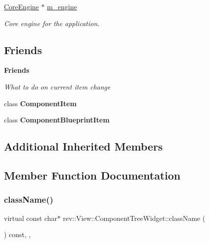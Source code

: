 \begin{Indent}
\begin{DoxyCompactItemize}
\mbox{\label{classrev_1_1_view_1_1_component_tree_widget_a73fb084a1152bd0651b83a28541cb4d8}} 
\mbox{\hyperlink{classrev_1_1_core_engine}{Core\+Engine}} $\ast$ \mbox{\hyperlink{classrev_1_1_view_1_1_component_tree_widget_a73fb084a1152bd0651b83a28541cb4d8}{m\+\_\+engine}}
\begin{DoxyCompactList}\small\item\em Core engine for the application. \end{DoxyCompactList}\end{DoxyCompactItemize}
\end{Indent}
\subsection*{Friends}
\begin{Indent}\textbf{ Friends}\par
{\em What to do on current item change }\begin{DoxyCompactItemize}
\item 
\mbox{\label{classrev_1_1_view_1_1_component_tree_widget_acec94514a84d95eff36a2411ebf9c1c8}} 
class {\bfseries Component\+Item}
\item 
\mbox{\label{classrev_1_1_view_1_1_component_tree_widget_aeb71a91b3e1105443eee3dc173353d52}} 
class {\bfseries Component\+Blueprint\+Item}
\end{DoxyCompactItemize}
\end{Indent}
\subsection*{Additional Inherited Members}


\subsection{Member Function Documentation}
\mbox{\label{classrev_1_1_view_1_1_component_tree_widget_a906360e88a18432b36c9d769a8e3886c}} 
\subsubsection{\texorpdfstring{className()}{className()}}
{\footnotesize\ttfamily virtual const char$\ast$ rev\+::\+View\+::\+Component\+Tree\+Widget\+::class\+Name (\begin{DoxyParamCaption}{ }\end{DoxyParamCaption}) const\hspace{0.3cm}{\ttfamily [inline]}, {\ttfamily [override]}, {\ttfamily [virtual]}}



